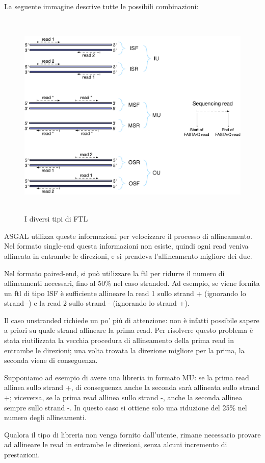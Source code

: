 La seguente immagine descrive tutte le possibili combinazioni:
\begin{figure}[h!]
	\centering
	\includegraphics[width=\linewidth, height=10cm]{images/fragmentlibrarytypes.png}
  \caption{I diversi tipi di FTL}
  \label{fig:FragmentLibraryTypes}
\end{figure}

\newpage

ASGAL utilizza queste informazioni per velocizzare il processo di allineamento. Nel formato single-end questa informazioni non esiste, quindi ogni read veniva allineata in entrambe le direzioni, e si prendeva l'allineamento migliore dei due. 

Nel formato paired-end, si può utilizzare la ftl per ridurre il numero di allineamenti necessari, fino al 50\% nel caso stranded. Ad esempio, se viene fornita un ftl di tipo ISF è sufficiente allineare la read 1 sullo strand + (ignorando lo strand -) e la read 2 sullo strand - (ignorando lo strand +).

Il caso unstranded richiede un po' più di attenzione: non è infatti possibile sapere a priori su quale strand allineare la prima read. Per risolvere questo problema è stata riutilizzata la vecchia procedura di allineamento della prima read in entrambe le direzioni; una volta trovata la direzione migliore per la prima, la seconda viene di conseguenza. 

Supponiamo ad esempio di avere una libreria in formato MU: se la prima read allinea sullo strand +, di conseguenza anche la seconda sarà allineata sullo strand +; viceversa, se la prima read allinea sullo strand -, anche la seconda allinea sempre sullo strand -. In questo caso si ottiene solo una riduzione del 25\% nel numero degli allineamenti.

Qualora il tipo di libreria non venga fornito dall'utente, rimane necessario provare ad allineare le read in entrambe le direzioni, senza alcuni incremento di prestazioni.


